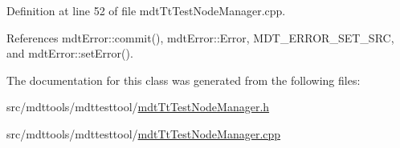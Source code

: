 Definition at line 52 of file mdt\-Tt\-Test\-Node\-Manager.\-cpp.



References mdt\-Error\-::commit(), mdt\-Error\-::\-Error, M\-D\-T\-\_\-\-E\-R\-R\-O\-R\-\_\-\-S\-E\-T\-\_\-\-S\-R\-C, and mdt\-Error\-::set\-Error().



The documentation for this class was generated from the following files\-:\begin{DoxyCompactItemize}
\item 
src/mdttools/mdttesttool/\hyperlink{mdt_tt_test_node_manager_8h}{mdt\-Tt\-Test\-Node\-Manager.\-h}\item 
src/mdttools/mdttesttool/\hyperlink{mdt_tt_test_node_manager_8cpp}{mdt\-Tt\-Test\-Node\-Manager.\-cpp}\end{DoxyCompactItemize}
